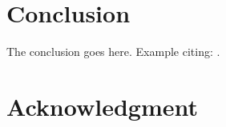 \documentclass[conference]{IEEEtran}
\begin{document}
%






\section{Conclusion}
The conclusion goes here. Example citing: \cite{IEEEexample:articleetal}.






\section*{Acknowledgment}
\end{document}
